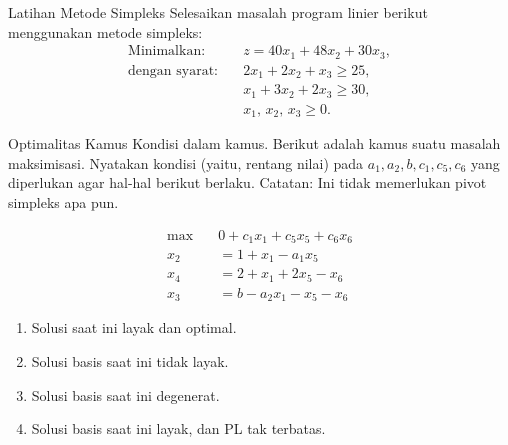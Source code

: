 \begin{ex}{Latihan Metode Simpleks}{}
\label{ex:simplex-bigm-practice-2}
 Selesaikan masalah program linier berikut menggunakan metode simpleks:
\[
\begin{aligned}
\text{Minimalkan:}\quad & z = 40x_{1} + 48x_{2} + 30x_{3}, \\
\text{dengan syarat:}\quad & 2x_{1} + 2x_{2} + x_{3} \ge 25,\\
& x_{1} + 3x_{2} + 2x_{3} \ge 30,\\
& x_{1},\, x_{2},\, x_{3} \ge 0.
\end{aligned}
\]
\exrefs{\S\ref{sec:big-m-dictionary}}
\end{ex}


\begin{ex}{Optimalitas Kamus}{}
\label{ex:dictionary-optimality-conditions}
 {Kondisi dalam kamus.} Berikut adalah kamus suatu masalah maksimisasi. Nyatakan kondisi (yaitu, rentang nilai) pada $a_{1}, a_{2}, b, c_{1}, c_{5}, c_{6}$ yang diperlukan agar hal-hal berikut berlaku. Catatan: Ini tidak memerlukan pivot simpleks apa pun.
\begin{center}
\begin{align*}
\max \quad &0 + c_1 x_1 + c_5 x_5 + c_6 x_6 \\
x_2 &= 1 + x_1 - a_1 x_5 \\
x_4 &= 2 + x_1 + 2x_5 - x_6 \\
x_3 &= b - a_2 x_1 - x_5 - x_6
\end{align*}
\end{center}

\begin{enumerate}
\item Solusi saat ini layak dan optimal.
\item Solusi basis saat ini tidak layak.
\item Solusi basis saat ini degenerat.
\item Solusi basis saat ini layak, dan PL tak terbatas.
\end{enumerate}
\exrefs{\S\ref{sec:simplex-algorithm}; \S\ref{sec:degeneracy}}
\end{ex}

